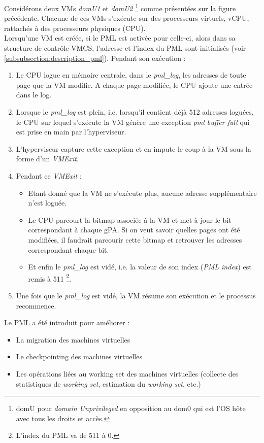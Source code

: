 \noindent Considérons deux VMs \textit{domU1} et \textit{domU2} \footnote{domU pour \textit{domain Unprivileged} en opposition au dom0 qui est l'OS hôte avec tous les droits et accès.} comme présentées sur la figure précédente. Chacune de ces VMs s'exécute sur des processeurs virtuels, \ac{vCPU}, rattachés à des processeurs physiques (\acs{CPU}).\\
Lorsqu'une VM est créée, si le PML est activée pour celle-ci, alors dans sa structure de contrôle \ac{VMCS}, l'adresse et l'index du PML sont initialisés (voir \ref{subsubsection:description_pml}). Pendant son exécution :

\begin{enumerate}[label=\textbf{(\roman*)}]
    \item Le CPU logue en mémoire centrale, dans le \textit{pml\_log}, les adresses de toute page que la VM modifie. A chaque page modifiée, le CPU ajoute une entrée dans le log.
    \item Lorsque le \textit{pml\_log} est plein, i.e. lorsqu'il contient déjà 512 adresses loguées, le CPU sur lequel s'exécute la VM génère une exception \textit{pml buffer full} qui est prise en main par l'hyperviseur.
    \item L'hyperviseur capture cette exception et en impute le coup à la VM sous la forme d'un \textit{VMExit}.
    \item Pendant ce \textit{VMExit} :
    
        \begin{itemize}
            \item Etant donné que la VM ne s'exécute plus, aucune adresse supplémentaire n'est loguée.
            \item Le CPU parcourt la bitmap associée à la VM et met à jour le bit correspondant à chaque gPA. Si on veut savoir quelles pages ont été modifiées, il faudrait parcourir cette bitmap et retrouver les adresses correspondant chaque bit.
            \item Et enfin le \textit{pml\_log} est vidé, i.e. la valeur de son index (\textit{PML index}) est remis à 511 \footnote{L'index du PML va de 511 à 0.}. 
        \end{itemize}
    
    \item Une fois que le \textit{pml\_log} est vidé, la VM résume son exécution et le processus recommence.
\end{enumerate}

\noindent Le PML a été introduit pour améliorer :
\begin{itemize}
    \item La migration des machines virtuelles
    \item Le checkpointing \cite{checkpointing} des machines virtuelles
    \item Les opérations liées au working set des machines virtuelles (collecte des statistiques de \textit{working set}, estimation du \textit{working set}, etc.)
\end{itemize}

